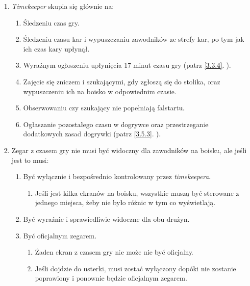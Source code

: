 \documentclass[11pt,a4paper]{article}
\renewcommand{\subsubsection}[1]{
  \oldsubsubsection{#1}%
  \label{\thesubsubsection}
}
\newcommand{\myref}[1]{\ref{#1}. \nameref{#1}}
\begin{document}
\subsubsection{\emph{Timekeeper}}
\begin{enumerate}
  \item \emph{Timekeeper} skupia się głównie na:
  \begin{enumerate}
    \item Śledzeniu czas gry.
    \item Śledzeniu czasu kar i wypuszczaniu zawodników ze strefy kar, po tym jak ich czas kary upłynął.
    \item Wyraźnym ogłoszeniu upłynięcia 17 minut czasu gry (patrz \myref{3.3.4}).
    \item Zajęcie się zniczem i szukającymi, gdy zgłoszą się do stolika, oraz wypuszczeniu ich na boisko w odpowiednim czasie.
    \item Obserwowaniu czy szukający nie popełniają falstartu.
    \item Ogłaszanie pozostałego czasu w dogrywce oraz przestrzeganie dodatkowych zasad dogrywki (patrz \myref{3.5.3}).
  \end{enumerate}
  \item Zegar z czasem gry nie musi być widoczny dla zawodników na boisku, ale jeśli jest to musi:
  \begin{enumerate}
    \item Być wyłącznie i bezpośrednio kontrolowany przez \emph{timekeepera}.
    \begin{enumerate}
      \item Jeśli jest kilka ekranów na boisku, wszystkie muszą być sterowane z jednego miejsca, żeby nie było różnic w tym co wyświetlają.
    \end{enumerate}
    \item Być wyraźnie i sprawiedliwie widoczne dla obu drużyn.
    \item Być oficjalnym zegarem.
    \begin{enumerate}
      \item Żaden ekran z czasem gry nie może nie być oficjalny.
      \item Jeśli dojdzie do usterki, musi zostać wyłączony dopóki nie zostanie poprawiony i ponownie będzie oficjalnym zegarem.
    \end{enumerate}
  \end{enumerate}
\end{enumerate}
\end{document}
